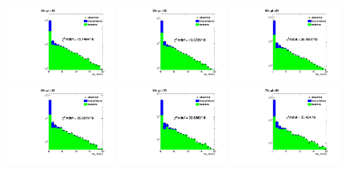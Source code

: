 \documentclass[thesis.tex]{subfiles}
\renewcommand\_{\textunderscore\allowbreak}
\begin{document}
\begin{figure}
   \includegraphics[width=0.32\textwidth]{Figures/frac-45-50_ChIso-DoubleEG-ReMiniAOD.pdf}   \includegraphics[width=0.32\textwidth]{Figures/frac-50-55_ChIso-DoubleEG-ReMiniAOD.pdf}         \includegraphics[width=0.32\textwidth]{Figures/frac-55-60_ChIso-DoubleEG-ReMiniAOD.pdf} \\
   \includegraphics[width=0.32\textwidth]{Figures/frac-60-65_ChIso-DoubleEG-ReMiniAOD.pdf}   \includegraphics[width=0.32\textwidth]{Figures/frac-65-70_ChIso-DoubleEG-ReMiniAOD.pdf}         \includegraphics[width=0.32\textwidth]{Figures/frac-70-80_ChIso-DoubleEG-ReMiniAOD.pdf} \\

\end{figure}
\end{document}
